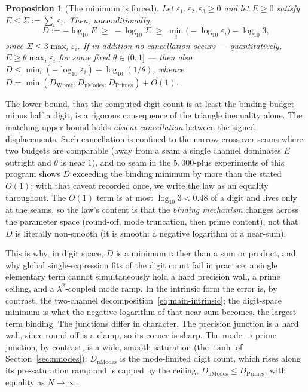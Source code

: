 \documentclass[11pt,a4paper]{article}
\newtheorem{proposition}{Proposition}
\begin{document}
\begin{proposition}[The minimum is forced]\label{prop:min}
Let $\varepsilon_1,\varepsilon_2,\varepsilon_3\ge0$ and let $E\ge0$ satisfy
$E\le\Sigma:=\sum_i\varepsilon_i$. Then, unconditionally,
\[
  D:=-\log_{10}E\;\ge\;-\log_{10}\Sigma
  \;\ge\;\min_i\bigl(-\log_{10}\varepsilon_i\bigr)-\log_{10}3 ,
\]
since $\Sigma\le 3\max_i\varepsilon_i$. If in addition no cancellation occurs
--- quantitatively, $E\ge\theta\max_i\varepsilon_i$ for some fixed
$\theta\in(0,1]$ --- then also
$D\le\min_i(-\log_{10}\varepsilon_i)+\log_{10}(1/\theta)$, whence
$D=\min(D_{\mathrm{Wprec}},D_{\mathrm{nModes}},D_{\mathrm{Primes}})+O(1)$.
\end{proposition}

The lower bound, that the computed digit count is at least the binding budget
minus half a digit, is a rigorous consequence of the triangle inequality
alone. The matching upper bound holds \emph{absent cancellation} between the
signed displacements. Such cancellation is confined to the narrow crossover
seams where two budgets are comparable (away from a seam a single channel
dominates $E$ outright and $\theta$ is near $1$), and no seam in the
$5{,}000$-plus experiments of this program shows $D$ exceeding the binding
minimum by more than the stated $O(1)$; with that caveat recorded once, we
write the law as an equality throughout. The $O(1)$ term is at most
$\log_{10}3<0.48$ of a digit and lives only at the seams, so the law's content
is that the \emph{binding mechanism} changes across the parameter space
(round-off, mode truncation, then prime content), not that $D$ is literally
non-smooth (it is smooth: a negative logarithm of a near-sum).

This is why, in digit space, $D$ is a minimum rather than a sum or product, and
why global single-expression fits of the digit count fail in practice: a single
elementary term cannot simultaneously hold a hard precision wall, a prime
ceiling, and a $\lambda^2$-coupled mode ramp. In the intrinsic form the error
is, by contrast, the two-channel decomposition~\eqref{eq:main-intrinsic}; the
digit-space minimum
is what the negative logarithm of that near-sum becomes, the largest term
binding. The junctions differ in character.
The precision junction is a hard wall, since round-off is a clamp, so its corner
is sharp. The mode$\to$prime junction, by contrast, is a wide, smooth saturation
(the $\tanh$ of Section~\ref{sec:nmodes}): $D_{\mathrm{nModes}}$ is the
mode-limited digit count, which rises along its pre-saturation ramp and is capped
by the ceiling, $D_{\mathrm{nModes}}\le D_{\mathrm{Primes}}$, with equality as
$N\to\infty$.
\end{document}
